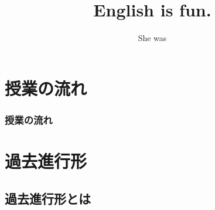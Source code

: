 \documentclass[aspectratio=169,xcolor={dvipsnames,table}]{beamer}
\title{English is fun.}
\subtitle{She was }
\author{}
\institute[]{}
\date[]
\begin{document}
\begin{frame}[plain]
  \titlepage
\end{frame}


\section*{授業の流れ}
\begin{frame}[plain]
  \frametitle{授業の流れ}
  \tableofcontents
\end{frame}

\section{過去進行形}

\subsection{過去進行形とは}
\end{document}
